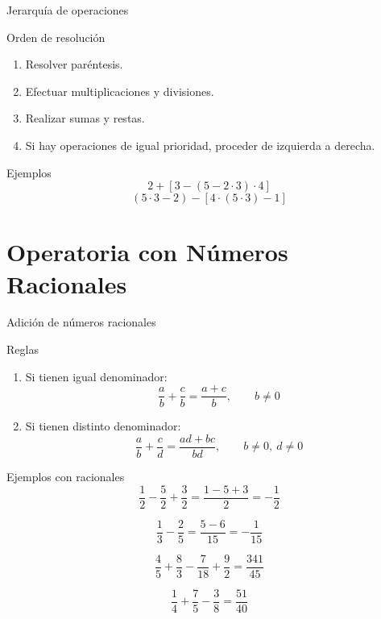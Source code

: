 \documentclass[aspectratio=169,10pt]{beamer}
\begin{document}
	\begin{frame}{Jerarquía de operaciones}
		\begin{block}{Orden de resolución}
			\begin{enumerate}[<+->]
				\item Resolver paréntesis.
				\item Efectuar multiplicaciones y divisiones.
				\item Realizar sumas y restas.
				\item Si hay operaciones de igual prioridad, proceder de izquierda a derecha.
			\end{enumerate}
		\end{block}
		
		\begin{exampleblock}{Ejemplos}
			\[
			2+[3-(5-2\cdot3)\cdot4]
			\]
			\[
			(5\cdot3-2)-[4\cdot(5\cdot3)-1]
			\]
		\end{exampleblock}
	\end{frame}
	
	\section{Operatoria con Números Racionales}
	
	\begin{frame}{Adición de números racionales}
		\begin{block}{Reglas}
			\begin{enumerate}[<+->]
				\item Si tienen igual denominador:
				\[
				\frac{a}{b}+\frac{c}{b}=\frac{a+c}{b},\qquad b\neq0
				\]
				\item Si tienen distinto denominador:
				\[
				\frac{a}{b}+\frac{c}{d}=\frac{ad+bc}{bd},\qquad b\neq0,\ d\neq0
				\]
			\end{enumerate}
		\end{block}
	\end{frame}
	
	\begin{frame}{Ejemplos con racionales}
		\[
		\frac12-\frac52+\frac32=\frac{1-5+3}{2}=-\frac12
		\]
		
		\vspace{0.3cm}
		
		\[
		\frac13-\frac25=\frac{5-6}{15}=-\frac1{15}
		\]
		
		\vspace{0.3cm}
		
		\[
		\frac45+\frac83-\frac7{18}+\frac92=\frac{341}{45}
		\]
		
		\vspace{0.3cm}
		
		\[
		\frac14+\frac75-\frac38=\frac{51}{40}
		\]
	\end{frame}
	
\end{document}
